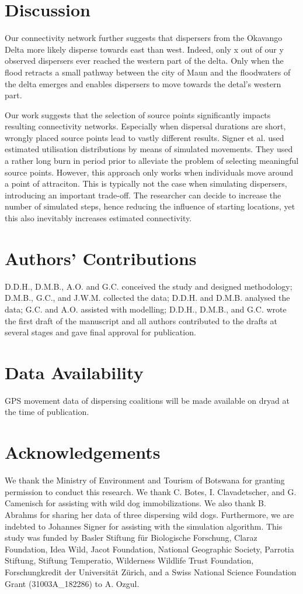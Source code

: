 \documentclass[abstract=on,10pt,a4paper,bibliography=totocnumbered]{article}
\begin{document}
\section{Discussion}
Our connectivity network further suggests that dispersers from the Okavango
Delta more likely disperse towards east than west. Indeed, only x out of our y
observed dispersers ever reached the western part of the delta. Only when the
flood retracts a small pathway between the city of Maun and the floodwaters of
the delta emerges and enables dispersers to move towards the detal's western
part.

Our work suggests that the selection of source points significantly impacts
resulting connectivity networks. Especially when dispersal durations are short,
wrongly placed source points lead to vastly different results. Signer et al.
used estimated utilisation distributions by means of simulated movements. They
used a rather long burn in period prior to alleviate the problem of selecting
meaningful source points. However, this approach only works when individuals
move around a point of attraciton. This is typically not the case when
simulating dispersers, introducing an important trade-off. The researcher can
decide to increase the number of simulated steps, hence reducing the influence
of starting locations, yet this also inevitably increases estimated
connectivity.

\section{Authors' Contributions}
D.D.H., D.M.B., A.O. and G.C. conceived the study and designed methodology;
D.M.B., G.C., and J.W.M. collected the data; D.D.H. and D.M.B. analysed the
data; G.C. and A.O. assisted with modelling; D.D.H., D.M.B., and G.C. wrote the
first draft of the manuscript and all authors contributed to the drafts at
several stages and gave final approval for publication.

\section{Data Availability}
GPS movement data of dispersing coalitions will be made available on dryad at
the time of publication.

\section{Acknowledgements}
We thank the Ministry of Environment and Tourism of Botswana for granting
permission to conduct this research. We thank C. Botes, I. Clavadetscher, and G.
Camenisch for assisting with wild dog immobilizations. We also thank B. Abrahms
for sharing her data of three dispersing wild dogs. Furthermore, we are indebted
to Johannes Signer for assisting with the simulation algorithm. This study was
funded by Basler Stiftung für Biologische Forschung, Claraz Foundation, Idea
Wild, Jacot Foundation, National Geographic Society, Parrotia Stiftung, Stiftung
Temperatio, Wilderness Wildlife Trust Foundation, Forschungkredit der
Universität Zürich, and a Swiss National Science Foundation Grant
(31003A\_182286) to A. Ozgul.

\newpage
\begingroup
\singlespacing

\endgroup
\end{document}
